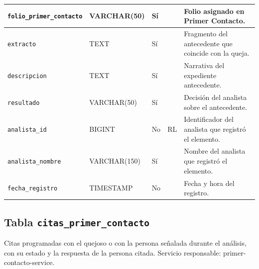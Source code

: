\begin{longtable}{|L{3.9cm}|L{2.4cm}|L{0.9cm}|L{1.2cm}|L{6.6cm}|}
		\texttt{folio\_\allowbreak{}primer\_\allowbreak{}contacto} & VARCHAR(50) & Sí &  & Folio asignado en Primer Contacto. \\ \hline
		\texttt{extracto} & TEXT & Sí &  & Fragmento del antecedente que coincide con la queja. \\ \hline
		\texttt{descripcion} & TEXT & Sí &  & Narrativa del expediente antecedente. \\ \hline
		\texttt{resultado} & VARCHAR(50) & Sí &  & Decisión del analista sobre el antecedente. \\ \hline
		\texttt{analista\_\allowbreak{}id} & BIGINT & No & RL & Identificador del analista que registró el elemento. \\ \hline
		\texttt{analista\_\allowbreak{}nombre} & VARCHAR(150) & Sí &  & Nombre del analista que registró el elemento. \\ \hline
		\texttt{fecha\_\allowbreak{}registro} & TIMESTAMP & No &  & Fecha y hora del registro. \\ \hline
\end{longtable}
\normalsize
\setlength{\tabcolsep}{6pt}
\renewcommand{\arraystretch}{1}

\subsection{Tabla \texttt{citas\_primer\_contacto}}
Citas programadas con el quejoso o con la persona señalada durante el análisis, con su estado y la respuesta de la persona citada. Servicio responsable: primer-contacto-service.


